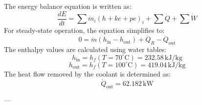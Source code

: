 The energy balance equation is written as:  
\[
\frac{dE}{dt} = \sum \dot{m}_i \left( h + ke + pe \right)_i + \sum \dot{Q} + \sum \dot{W}
\]  
For steady-state operation, the equation simplifies to:  
\[
0 = \dot{m} \left( h_{\text{in}} - h_{\text{out}} \right) + \dot{Q}_R - \dot{Q}_{\text{out}}
\]  
The enthalpy values are calculated using water tables:  
\[
h_{\text{in}} = h_f(T = 70^\circ\text{C}) = 232.58 \, \text{kJ/kg}
\]  
\[
h_{\text{out}} = h_f(T = 100^\circ\text{C}) = 419.04 \, \text{kJ/kg}
\]  
The heat flow removed by the coolant is determined as:  
\[
\dot{Q}_{\text{out}} = 62.182 \, \text{kW}
\]  

---